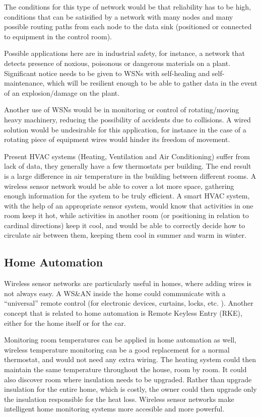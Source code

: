 The conditions for this type of network would be that reliability has to be high, conditions that can be satisified by a network
with many nodes and many possible routing paths from each node to the data sink (positioned or connected to equipment in the control
room).

Possible applications here are in industrial safety, for instance, a network that detects presence of noxious, poisonous or
dangerous materials on a plant. Significant notice needs to be given to WSNs with self-healing and self-maintenance,
which will be resilient enough to be able to gather data in the event of an explosion/damage on the plant.

Another use of WSNs would be in monitoring or control of rotating/moving heavy machinery, reducing the possibility of
accidents due to collisions. A wired solution would be undesirable for this application, for instance in the case of a rotating
piece of equipment wires would hinder its freedom of movement. 

Present HVAC systems (Heating, Ventilation and Air Conditioning) suffer from lack of data, they generally have a few
thermostats per building. The end result is a large difference in air temperature in the building between different rooms. A wireless sensor
network would be able to cover a lot more space, gathering enough information for the system to be truly efficient. A smart HVAC system,
with the help of an appropriate sensor system, would know that activities in one room keep it hot, while activities in another room (or
positioning in relation to cardinal directions) keep it cool, and would be able to correctly decide how to circulate air between them,
keeping them cool in summer and warm in winter.

\subsection{Home Automation}

Wireless sensor networks are particularly useful in homes, where adding wires is not always easy. A WS\&AN inside the home could communicate 
with a ``universal'' remote control (for electronic devices, curtains, locks, etc. ). Another concept that is related to home automation is 
Remote Keyless Entry (RKE), either for the home itself or for the car. 

Monitoring room temperatures can be applied in home automation as well, wireless temperature monitoring can be a good replacement for a 
normal thermostat, and would not need any extra wiring. The heating system could then maintain the same temperature throughout the house,
room by room. It could also discover room where insulation needs to be upgraded. Rather than upgrade insulation for the entire home, which
is costly, the owner could then upgrade only the insulation responsible for the heat loss. Wireless sensor networks make intelligent home 
monitoring systems more accesible and more powerful.

